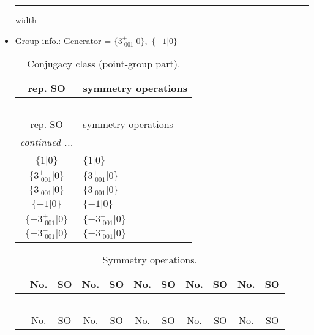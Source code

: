 \documentclass[fleqn,10pt,landscape]{article}
\begin{document}
\begin{itemize}
 \hfil \hrule height 1mm width \textwidth \hfil

\item Group info.: Generator = $\{3^{+}_{\,\,001}|0\},\,\,\{-1|0\}$

\begin{center}
\renewcommand{\arraystretch}{1.3}
\begin{longtable}{c|l}
\caption{Conjugacy class (point-group part).}
 \\
 \hline \hline
rep. SO & symmetry operations \\ \hline \endfirsthead

\multicolumn{1}{l}{\tablename\ \thetable{}} \\
 \hline \hline
rep. SO & symmetry operations \\ \hline \endhead

 \hline \hline
\multicolumn{1}{r}{\footnotesize\it continued ...} \\ \endfoot

 \hline \hline
\multicolumn{1}{r}{} \\ \endlastfoot

$\{1|0\}$ & $\{1|0\}$ \\ \hline
$\{3^{+}_{\,\,001}|0\}$ & $\{3^{+}_{\,\,001}|0\}$ \\ \hline
$\{3^{-}_{\,\,001}|0\}$ & $\{3^{-}_{\,\,001}|0\}$ \\ \hline
$\{-1|0\}$ & $\{-1|0\}$ \\ \hline
$\{-3^{+}_{\,\,001}|0\}$ & $\{-3^{+}_{\,\,001}|0\}$ \\ \hline
$\{-3^{-}_{\,\,001}|0\}$ & $\{-3^{-}_{\,\,001}|0\}$ \\
\end{longtable}
\end{center}
\begin{center}
\renewcommand{\arraystretch}{1.3}
\begin{longtable}{c|cc|cc|cc|cc|cc}
\caption{Symmetry operations.}
 \\
 \hline \hline
 & No. & SO & No. & SO & No. & SO & No. & SO & No. & SO \\ \hline \endfirsthead

\multicolumn{10}{l}{\tablename\ \thetable{}} \\
 \hline \hline
 & No. & SO & No. & SO & No. & SO & No. & SO & No. & SO \\ \hline \endhead


\end{longtable}
\end{center}
\end{itemize}
\end{document}

